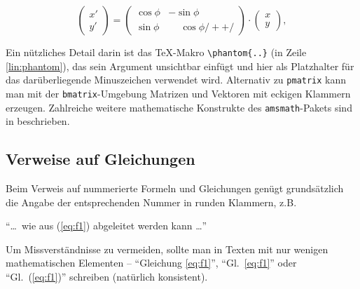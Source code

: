 \begin{equation}
	\begin{pmatrix} 
			x' \\ 
			y' 
	\end{pmatrix}
	= 
	\begin{pmatrix}
		  \cos \phi & -\sin \phi \\
		  \sin \phi & \phantom{-}\cos \phi /+ \label{lin:phantom} +/
	\end{pmatrix} 
	\cdot
	\begin{pmatrix} 
			x \\ 
			y 
	\end{pmatrix} ,
\end{equation}
%

Ein nützliches Detail darin ist das TeX-Makro \verb!\phantom{..}! (in Zeile \ref{lin:phantom}), das sein Argument unsichtbar einfügt und hier als Platzhalter für das darüberliegende Minuszeichen verwendet wird. Alternativ zu \texttt{pmatrix} kann man mit der \texttt{bmatrix}-Umgebung Matrizen
und Vektoren mit eckigen Klammern erzeugen.
Zahlreiche weitere mathematische Konstrukte des \texttt{amsmath}-Pakets sind in \autocite{amsldoc02} beschrieben.



\subsection{Verweise auf Gleichungen}
\label{sec:VerweiseAufGleichungen}

Beim Verweis auf nummerierte Formeln und Gleichungen genügt grundsätzlich die Angabe 
der entsprechenden Nummer in runden Klammern,
z.B.
\begin{center}
"`\ldots\ wie aus (\ref{eq:f1}) abgeleitet werden kann \ldots"'
\end{center}
Um Missverständnisse zu vermeiden, sollte man in Texten mit
nur wenigen mathematischen Elementen -- "`Gleichung \ref{eq:f1}"', "`Gl.~\ref{eq:f1}"' 
oder "`Gl.~(\ref{eq:f1})"' schreiben (natürlich konsistent). 

\begin{center}
\setlength{\fboxrule}{0.2mm}
\setlength{\fboxsep}{2mm}
\end{center}


